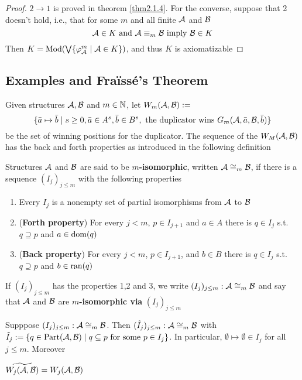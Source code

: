 \documentclass[11pt]{article}
\def \Part {\text{Part}}
\begin{document}
\begin{proof}
\(2\to1\) is proved in theorem \ref{thm2.1.4}. For the converse, suppose that 2 doesn't hold, i.e.,
that for some \(m\) and all finite \(\mathcal{A}\) and \(\mathcal{B}\)
\begin{equation*}
\mathcal{A}\in K\text{ and }\mathcal{A}\equiv_m\mathcal{B}\text{ imply }\mathcal{B}\in K
\end{equation*}
Then \(K=\operatorname{Mod}(\bigvee\{\varphi_{\mathcal{A}}^m\mid \mathcal{A}\in K\})\), and thus \(K\) is axiomatizable
\end{proof}


\subsection{Examples and Fraïssé's Theorem}
\label{sec:org026e9ce}
Given structures \(\mathcal{A},\mathcal{B}\) and \(m\in\mathbb{N}\), let \(W_m(\mathcal{A},\mathcal{B}):=\)
\begin{equation*}
\{\bar{a}\mapsto\bar{b}\mid s\ge0,\bar{a}\in A^s,\bar{b}\in B^s,\text{ the duplicator wins }
G_m(\mathcal{A},\bar{a},\mathcal{B},\bar{b})\}
\end{equation*}
be the set of winning positions for the duplicator. The sequence of the \(W_M(\mathcal{A},\mathcal{B})\) has
the back and forth properties as introduced in the following definition

\begin{definition}[]
Structures \(\mathcal{A}\) and \(\mathcal{B}\) are said to be \textbf{\(m\)-isomorphic},
written \(\mathcal{A}\cong_m\mathcal{B}\), if there is a sequence \((I_j)_{j\le m}\) with the following
properties
\begin{enumerate}
\item Every \(I_j\) is a nonempty set of partial isomorphisms from \(\mathcal{A}\) to \(\mathcal{B}\)
\item (\textbf{Forth property}) For every \(j<m\), \(p\in I_{j+1}\) and \(a\in A\) there is \(q\in I_j\)
s.t. \(q\supseteq p\) and \(a\in\operatorname{dom}(q)\)
\item (\textbf{Back property}) For every \(j<m\), \(p\in I_{j+1}\), and \(b\in B\) there is \(q\in I_j\)
s.t. \(q\supseteq p\) and \(b\in\operatorname{ran}(q)\)
\end{enumerate}


If \((I_j)_{j\le m}\) has the properties 1,2 and 3, we write \((I_j)_{j\le m}:\mathcal{A}\cong_m\mathcal{B}\)
and say that \(\mathcal{A}\) and \(\mathcal{B}\) are \textbf{\(m\)-isomorphic via} \((I_j)_{j\le m}\)
\end{definition}

\begin{exercise}
\label{ex2.3.2}
Supppose \((I_j)_{j\le m}:\mathcal{A}\cong_m\mathcal{B}\).
Then \((\tilde{I}_j)_{j\le m}:\mathcal{A}\cong_m\mathcal{B}\)
with \(\tilde{I}_j:=\{q\in\Part(\cala,\calb)\mid q\subseteq p\text{ for some }p\in I_j\}\).
In particular, \(\emptyset\mapsto\emptyset\in I_j\) for all \(j\le m\). Moreover

\(\widetilde{W_j(\mathcal{A},\mathcal{B})}=W_j(\mathcal{A},\mathcal{B})\)
\end{exercise}
\end{document}
